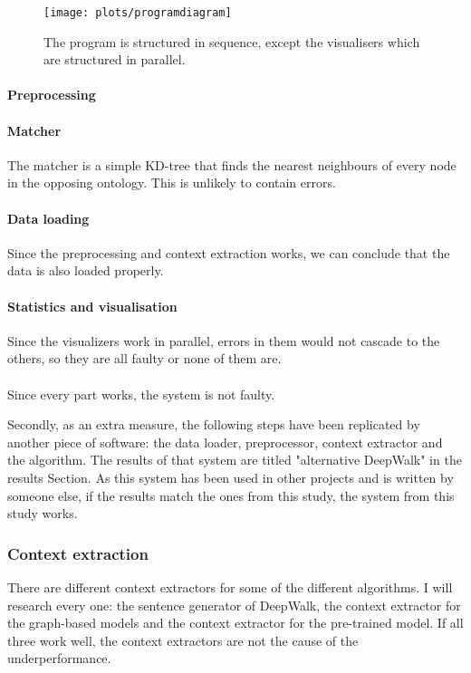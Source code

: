 \documentclass{article}
\begin{document}
  \begin{figure}[H]
  \texttt{[image: plots/programdiagram]}
  \label{program}
  \caption[Program diagram]{The program is structured in sequence, except the visualisers which are structured in parallel.}
  \end{figure}
  
  \paragraph{Preprocessing}
  \paragraph{Matcher}The matcher is a simple KD-tree that finds the nearest neighbours of every node in the opposing ontology. This is unlikely to contain errors.
  \paragraph{Data loading}
  Since the preprocessing and context extraction works, we can conclude that the data is also loaded properly.
  \paragraph{Statistics and visualisation}
  Since the visualizers work in parallel, errors in them would not cascade to the others, so they are all faulty or none of them are.
  \paragraph{}
  Since every part works, the system is not faulty. %
  
  Secondly, as an extra measure, the following steps have been replicated by another piece of software: the data loader, preprocessor, context extractor and the algorithm. The results of that system are titled "alternative DeepWalk" in the results Section. As this system has been used in other projects and is written by someone else, if the results match the ones from this study, the system from this study works.
  
  \subsubsection{Context extraction}
  There are different context extractors for some of the different algorithms. I will research every one: the sentence generator of DeepWalk, the context extractor for the graph-based models and the context extractor for the pre-trained model. If all three work well, the context extractors are not the cause of the underperformance.
\end{document}
